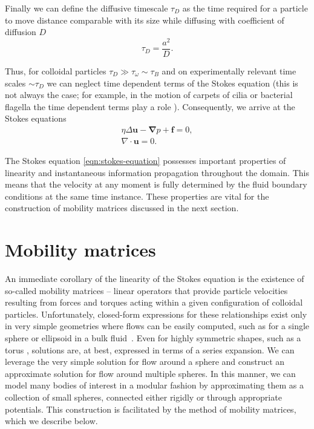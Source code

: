 \documentclass{doctoral}
\begin{document}
Finally we can define the diffusive timescale $\tau_D$ as the time required for a particle to move distance comparable with its size while diffusing with coefficient of diffusion $D$
\begin{equation}
    \tau_D = \frac{a^2}{D}.
    \label{eqn:diffusive-timescale}
\end{equation}

Thus, for colloidal particles $\tau_D \gg \tau_\omega \sim \tau_B$ and on experimentally relevant time scales $\sim \tau_D$ we can neglect time dependent terms of the Stokes equation (this is not always the case; for example, in the motion of carpets of cilia or bacterial flagella the time dependent terms play a role \cite{Wei_2021}).
Consequently, we arrive at the Stokes equations
\begin{eqnarray}
    \eta \Delta \bm{u} - \bm{\nabla} p + \bm{f} = 0, \label{eqn:stokes-equation} \\
    \nabla \cdot \bm{u} = 0.
\end{eqnarray}

The Stokes equation \eqref{eqn:stokes-equation} possesses important properties of linearity and instantaneous information propagation throughout the domain.
This means that the velocity at any moment is fully determined by the fluid boundary conditions at the same time instance.
These properties are vital for the construction of mobility matrices discussed in the next section.

\section{Mobility matrices}

An immediate corollary of the linearity of the Stokes equation is the existence of so-called mobility matrices -- linear operators that provide particle velocities resulting from forces and torques acting within a given configuration of colloidal particles.
Unfortunately, closed-form expressions for these relationships exist only in very simple geometries where flows can be easily computed, such as for a single sphere or ellipsoid in a bulk fluid~\cite{Kim_2013}.
Even for highly symmetric shapes, such as a torus \cite{Goren_1980, Majumdar_1977}, solutions are, at best, expressed in terms of a series expansion.
We can leverage the very simple solution for flow around a sphere and construct an approximate solution for flow around multiple spheres.
In this manner, we can model many bodies of interest in a modular fashion by approximating them as a collection of small spheres, connected either rigidly or through appropriate potentials.
This construction is facilitated by the method of mobility matrices, which we describe below.
\end{document}
